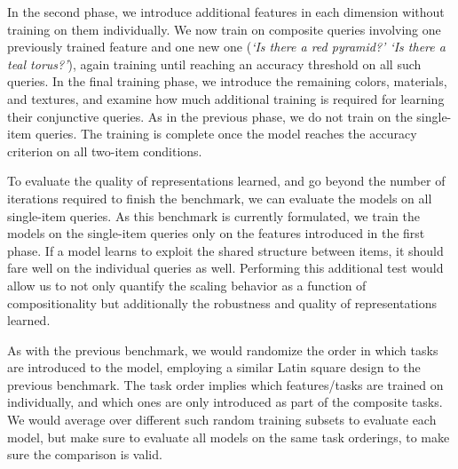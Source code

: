 In the second phase, we introduce additional features in each dimension without training on them individually. We now train on composite queries involving one previously trained feature and one new one (\textit{`Is there a red pyramid?’ `Is there a teal torus?’}), again training until reaching an accuracy threshold on all such queries. In the final training phase, we introduce the remaining colors, materials, and textures, and examine how much additional training is required for learning their conjunctive queries. As in the previous phase, we do not train on the single-item queries. The training is complete once the model reaches the accuracy criterion on all two-item conditions. 

To evaluate the quality of representations learned, and go beyond the number of iterations required to finish the benchmark, we can evaluate the models on all single-item queries. As this benchmark is currently formulated, we train the models on the single-item queries only on the features introduced in the first phase. If a model learns to exploit the shared structure between items, it should fare well on the individual queries as well. Performing this additional test would allow us to not only quantify the scaling behavior as a function of compositionality but additionally the robustness and quality of representations learned. 

As with the previous benchmark, we would randomize the order in which tasks are introduced to the model, employing a similar Latin square design to the previous benchmark. The task order implies which features/tasks are trained on individually, and which ones are only introduced as part of the composite tasks. We would average over different such random training subsets to evaluate each model, but make sure to evaluate all models on the same task orderings, to make sure the comparison is valid. 
